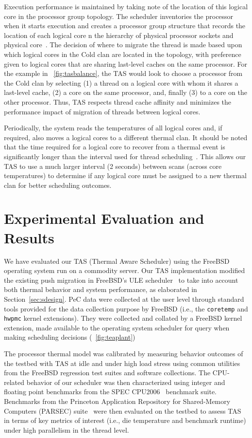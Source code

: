 \documentclass[times, 10pt,twocolumn]{IEEEtran}
\begin{document}
Execution performance is maintained by taking note of the location of
this logical core in the processor group topology.  The scheduler
inventories the processor when it starts execution and creates a
processor group structure that records the location of each logical core
n the hierarchy of physical processor sockets and physical
core~\cite{McKusick2004b}.  The decision of where to migrate the thread
is made based upon which logical cores in the Cold clan are located in
the topology, with preference given to logical cores that are sharing
last-level caches on the same processor.  For the example in
\figurename~\ref{fig:tasbalance}, the TAS would look to choose a
processor from the Cold clan by selecting (1) a thread on a logical core
with whom it shares a last-level cache, (2) a core on the same
processor, and, finally (3) to a core on the other processor.  Thus, TAS
respects thread cache affinity and minimizes the performance impact of
migration of threads between logical cores.

Periodically, the system reads the temperatures of all logical cores
and, if required, also moves a logical cores to a different thermal
clan.  It should be noted that the time required for a logical core to
recover from a thermal event is significantly longer than the interval
used for thread scheduling~\cite{Choi2007}. This allows our TAS to use a
much larger interval (2 seconds) between scans (across core
temperatures) to determine if any logical core must be assigned to a new
thermal clan for better scheduling outcomes.

\section{Experimental Evaluation and Results}
\label{sec:experiment} 
We have evaluated our TAS (Thermal Aware Scheduler) using the FreeBSD
operating system run on a commodity server.  Our TAS implementation
modified the existing push migration in FreeBSD's ULE
scheduler~\cite{Roberson2003} to take into account both thermal behavior
and system performance, as elaborated in Section~\ref{sec:sdesign}.  PeC
data were collected at the user level through standard tools provided
for the data collection purpose by FreeBSD (i.e., the \texttt{coretemp}
and \texttt{hwpmc} kernel extensions).  They were collected and collated
by a FreeBSD kernel extension, made available to the operating system
scheduler for query when making scheduling decisions
(\figurename~\ref{fig:teaplant})

The processor thermal model was calibrated by measuring behavior
outcomes of the testbed with TAS at idle and under high load stress
using common utilities from the FreeBSD regression test suites and
software collections.  The CPU-related behavior of our scheduler was
then characterized using integer and floating point benchmarks from the
SPEC CPU2006~\cite{Henning2006} benchmark suite.  Benchmarks from the
Princeton Application Repository for Shared-Memory Computers (PARSEC)
suite~\cite{Bienia2008} were then evaluated on the testbed to assess TAS
in terms of key metrics of interest (i.e., die temperature and benchmark
runtime) under high parallelism in the thread level.
\end{document}
